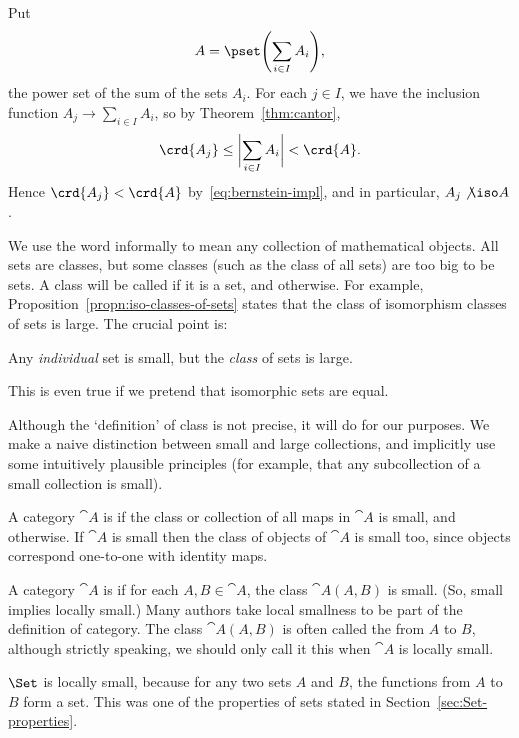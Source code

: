 \begin{pf}
Put
\[
A = \pset\Biggl(\sum_{i \in I} A_i\Biggr),
\]
the power set of the sum of the sets $A_i$.  For each $j \in I$, we have
the inclusion function $A_j \to \sum_{i \in I} A_i$, so by
Theorem~\ref{thm:cantor},
\[
\crd{A_j} \leq \biggl| \sum_{i \in I} A_i \biggr| < \crd{A}.
\]
Hence $\crd{A_j} < \crd{A}$ by~\eqref{eq:bernstein-impl}, and in particular,
$A_j \not\iso A$.
\end{pf}
%
%

We use the word %
%
%
informally to mean any collection of mathematical objects.  All sets are
classes, but some classes (such as the class of all sets) are too big to be
sets.  A class will be called %
%
%
if it is a set, and %
%
%
otherwise.  For example, Proposition~\ref{propn:iso-classes-of-sets} states
that the class of isomorphism classes of sets is large.  The crucial point
is:
% 
\begin{slogan}
Any \emph{individual} set is small, but the \emph{class} of sets is
large.
\end{slogan}
% 
This is even true if we pretend that isomorphic sets are equal.

Although the `definition' of class is not precise, it will do for our
purposes.  We make a naive distinction between small and large collections,
and implicitly use some intuitively plausible principles (for example, that
any subcollection of a small collection is small).

A category $\cat{A}$ is %
%
%
%
if the class or collection of all maps in $\cat{A}$ is small, and
%
%
%
%
otherwise.  If $\cat{A}$ is small then the class of objects of $\cat{A}$ is
small too, since objects correspond one-to-one with identity maps.

A category $\cat{A}$ is %
%
%
%
if for each $A, B \in \cat{A}$, the class $\cat{A}(A, B)$ is small.  (So,
small implies locally small.)  Many authors take local smallness to be part
of the definition of category.  The class $\cat{A}(A, B)$ is often called
the %
%
%
from $A$ to $B$, although strictly speaking, we should only call it this
when $\cat{A}$ is locally small.

\begin{example}
%
%
$\Set$ is locally small, because for any two sets $A$ and $B$, the
functions from $A$ to $B$ form a set.  This was one of the properties of
sets stated in Section~\ref{sec:Set-properties}.
\end{example}

